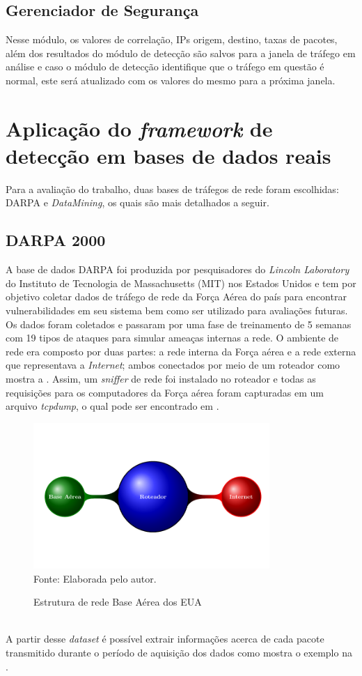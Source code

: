 \subsection{Gerenciador de Segurança}
Nesse módulo, os valores de correlação, IPs origem, destino, taxas de pacotes, além dos resultados do módulo de detecção são salvos para a janela de tráfego em análise e caso o módulo de detecção identifique que o tráfego em questão é normal, este será atualizado com os valores do mesmo para a próxima janela.

\section{Aplicação do \textit{framework} de detecção em bases de dados reais}
\label{Sec:NaHiD_VERC}
Para a avaliação do trabalho, duas bases de tráfegos de rede foram escolhidas: DARPA e  \textit{DataMining}, os quais são mais detalhados a seguir. 
\subsection{DARPA 2000}
 A base de dados DARPA foi produzida por pesquisadores do \textit{Lincoln Laboratory} do Instituto de Tecnologia de Massachusetts (MIT) nos Estados Unidos e tem por objetivo coletar dados de tráfego de rede da Força Aérea do país para encontrar vulnerabilidades em seu sistema bem como ser utilizado para avaliações futuras. Os dados foram coletados e passaram por uma fase de treinamento de 5 semanas com 19 tipos de ataques para simular ameaças internas a rede. O ambiente de rede era composto por duas partes: a rede interna da Força aérea e a rede externa que representava a \textit{Internet}; ambos conectados por meio de um roteador como mostra a .	Assim, um \textit{sniffer} de rede foi instalado no roteador e todas as requisições para os computadores da Força aérea foram capturadas em um arquivo \textit{tcpdump}, o qual pode ser encontrado em \cite{siteDarpa}. 
 \begin{figure}[ht]
 	\centering
	\caption{Estrutura de rede Base Aérea dos EUA }
		\includegraphics[width=0.8\textwidth]{figs/darpaStructure.pdf}\\
	{Fonte: Elaborada pelo autor.}
	\label{fig:DARPA_Estrututra}
\end{figure}
\\
A partir desse \textit{dataset} é possível extrair informações acerca de cada pacote transmitido durante o período de aquisição dos dados como mostra o exemplo na .

